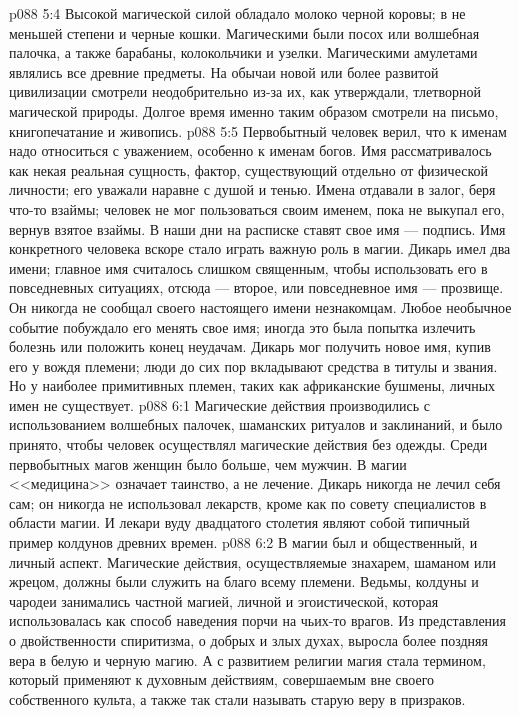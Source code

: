 \vs p088 5:4 Высокой магической силой обладало молоко черной коровы; в не меньшей степени и черные кошки. Магическими были посох или волшебная палочка, а также барабаны, колокольчики и узелки. Магическими амулетами являлись все древние предметы. На обычаи новой или более развитой цивилизации смотрели неодобрительно из\hyp{}за их, как утверждали, тлетворной магической природы. Долгое время именно таким образом смотрели на письмо, книгопечатание и живопись.
\vs p088 5:5 Первобытный человек верил, что к именам надо относиться с уважением, особенно к именам богов. Имя рассматривалось как некая реальная сущность, фактор, существующий отдельно от физической личности; его уважали наравне с душой и тенью. Имена отдавали в залог, беря что\hyp{}то взаймы; человек не мог пользоваться своим именем, пока не выкупал его, вернув взятое взаймы. В наши дни на расписке ставят свое имя --- подпись. Имя конкретного человека вскоре стало играть важную роль в магии. Дикарь имел два имени; главное имя считалось слишком священным, чтобы использовать его в повседневных ситуациях, отсюда --- второе, или повседневное имя --- прозвище. Он никогда не сообщал своего настоящего имени незнакомцам. Любое необычное событие побуждало его менять свое имя; иногда это была попытка излечить болезнь или положить конец неудачам. Дикарь мог получить новое имя, купив его у вождя племени; люди до сих пор вкладывают средства в титулы и звания. Но у наиболее примитивных племен, таких как африканские бушмены, личных имен не существует.
\vs p088 6:1 Магические действия производились с использованием волшебных палочек, шаманских ритуалов и заклинаний, и было принято, чтобы человек осуществлял магические действия без одежды. Среди первобытных магов женщин было больше, чем мужчин. В магии <<медицина>> означает таинство, а не лечение. Дикарь никогда не лечил себя сам; он никогда не использовал лекарств, кроме как по совету специалистов в области магии. И лекари вуду двадцатого столетия являют собой типичный пример колдунов древних времен.
\vs p088 6:2 В магии был и общественный, и личный аспект. Магические действия, осуществляемые знахарем, шаманом или жрецом, должны были служить на благо всему племени. Ведьмы, колдуны и чародеи занимались частной магией, личной и эгоистической, которая использовалась как способ наведения порчи на чьих\hyp{}то врагов. Из представления о двойственности спиритизма, о добрых и злых духах, выросла более поздняя вера в белую и черную магию. А с развитием религии магия стала термином, который применяют к духовным действиям, совершаемым вне своего собственного культа, а также так стали называть старую веру в призраков.
